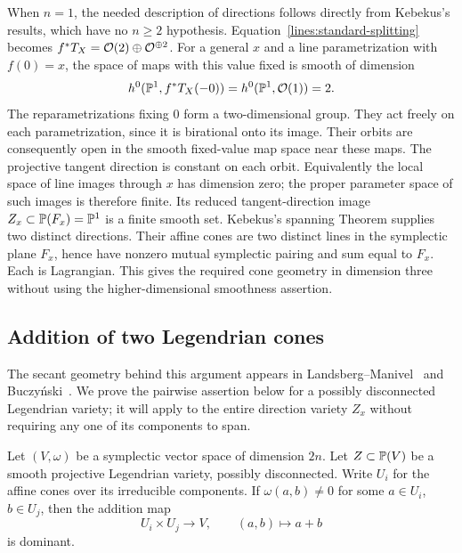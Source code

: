 When $n=1$, the needed description of directions follows directly
from Kebekus's results, which have no $n\geq2$ hypothesis.
Equation~\eqref{lines:standard-splitting} becomes
$f^*T_X=\mathcal O(2)\oplus\mathcal O^{\oplus2}$. For a general $x$ and a line
parametrization with $f(0)=x$, the space of maps with this value
fixed is smooth of dimension
\[
h^0(\mathbb P^1,f^*T_X(-0))=h^0(\mathbb P^1,\mathcal O(1))=2.
\]
The reparametrizations fixing $0$ form a two-dimensional group.
They act freely on each parametrization, since it is birational
onto its image. Their orbits are consequently open in the smooth
fixed-value map space near these maps. The projective tangent
direction is constant on each orbit. Equivalently the local
space of line images through $x$ has dimension zero; the proper
parameter space of such images is therefore finite. Its reduced
tangent-direction image $Z_x\subset\mathbb P(F_x)=\mathbb P^1$ is a finite
smooth set.
Kebekus's spanning Theorem supplies two distinct directions.
Their affine cones are two distinct lines in the symplectic
plane $F_x$, hence have nonzero mutual symplectic pairing and
sum equal to $F_x$. Each is Lagrangian.
This gives the required cone geometry in dimension three without
using the higher-dimensional smoothness assertion.

\subsection{Addition of two Legendrian cones}

The secant geometry behind this argument appears in
Landsberg--Manivel~\cite[Proposition~17(2) and its proof]{LandsbergManivel2007}
and Buczy\'nski~\cite[Proposition~3.5]{Buczynski2010}.
We prove the pairwise assertion below for a possibly disconnected
Legendrian variety; it will apply to the entire direction variety
$Z_x$ without requiring any one of its components to span.

\begin{lemma}\label{lines:cone-addition}
Let $(V,\omega)$ be a symplectic vector space of dimension $2n$.
Let $Z\subset\mathbb P(V)$ be a smooth projective Legendrian variety,
possibly disconnected. Write $U_i$ for the affine cones over
its irreducible components. If $\omega(a,b)\neq0$ for some
$a\in U_i$, $b\in U_j$, then the addition map
\[
U_i\times U_j\longrightarrow V,\qquad (a,b)\longmapsto a+b
\]
is dominant.
\end{lemma}

